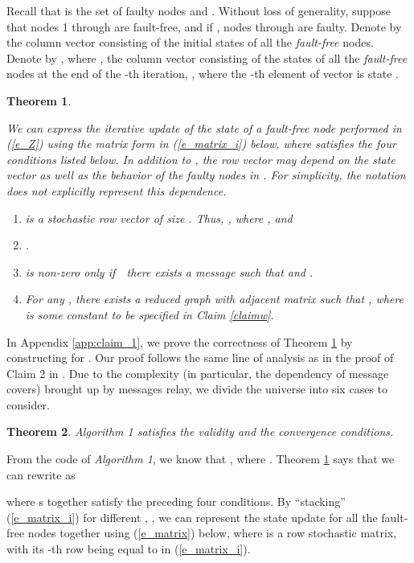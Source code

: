 \documentclass[letterpaper, 11pt]{article}
\newtheorem{theorem}{Theorem}[section]
\begin{document}
Recall that  is the set of faulty nodes and .
Without loss of generality, suppose that nodes 1 through  are
fault-free, and if , nodes  through  are faulty.
Denote by  the column vector consisting of the initial states of
all the {\em fault-free} nodes.
Denote by , where , the column vector consisting of
the states of all the {\em fault-free} nodes
at the end of the -th iteration, , where the -th element
of vector  is state . \begin{theorem}
\label{claim_1}
{
We can express the iterative update of the state
of a fault-free node  
performed in (\ref{e_Z}) using the matrix form in (\ref{e_matrix_i})
below,
where  satisfies the four conditions listed below.
In addition to , the row vector 
may depend on the state vector  as well as the
behavior of the faulty
nodes in . For simplicity, the notation  does not
explicitly represent this dependence.

}
\begin{enumerate}
\item  is a {\em stochastic} row vector of size .
Thus,
, where , and


\item .

\item  is non-zero
only if~~there exists a message  such that  and .
\item For any , there exists a reduced graph  with adjacent matrix  such that
, where  is some constant  to be specified in Claim \ref{claimw}.


\end{enumerate}
\end{theorem}
In Appendix \ref{app:claim_1}, we prove the correctness of Theorem \ref{claim_1} by constructing 
for . Our proof follows the same line of analysis as in the proof of Claim 2 in \cite{Vaidyamatrix}. Due to the complexity (in particular, the dependency of message covers) brought up by messages relay, we divide the universe into six cases to consider.



\begin{theorem}
\label{t}
\emph {Algorithm 1} satisfies the validity and the convergence conditions.
\end{theorem}



From the code of \emph {Algorithm 1}, we know that , where . Theorem \ref{claim_1} says that we can rewrite  as

where s together satisfy the preceding four conditions. By ``stacking'' (\ref{e_matrix_i}) for different
, , we can
represent the state update for all the fault-free nodes together
using (\ref{e_matrix})
below, where  is a  row stochastic matrix, with its -th row
being equal to  in (\ref{e_matrix_i}).
\end{document}

